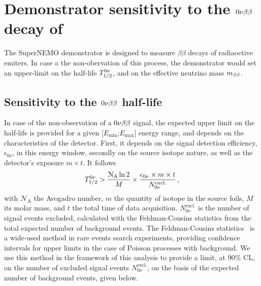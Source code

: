 \section{Demonstrator sensitivity to the $0\nu\beta\beta$ decay of \Se}
\label{sec:Nbkg_ROI}

The SuperNEMO demonstrator is designed to measure $\beta\beta$ decays of radiaoctive emiters.
In case a the non-obervation of this process, the demonstrator would set an upper-limit on the half-life $T_{1/2}^{0\nu}$, and on the effective neutrino mass $m_{\beta\beta}$.

\subsection{Sensitivity to the $0\nu\beta\beta$ half-life}

In case of the non-observation of a $0\nu\beta\beta$ signal, the expected upper limit on the half-life is provided for a given [$E_{\text{min}}$;$E_{\text{max}}$] energy range, and depends on the characteristics of the detector.
First, it depends on the signal detection efficiency, $\epsilon_{0\nu}$, in this energy window, secondly on the source isotope nature, as well as the detector's exposure $m\times t$.
It follows
\begin{equation}
  T_{1/2}^{0\nu} > \frac{\mathcal{N}_{\text{A}}\ln{2}}{M}\times \frac{\epsilon_{0\nu}\times m\times t}{N_{0\nu}^{\text{excl.}}}\,,
  \label{eq:tbeta_limit}
\end{equation}
with $\mathcal{N}_{\text{A}}$ the Avogadro number, $m$ the quantity of isotope in the source foils, $M$ its molar mass, and $t$ the total time of data acquisition.
$N_{0\nu}^{\text{excl.}}$ is the number of signal events excluded, calculated with the Feldman-Cousins statistics from the total expected number of background events.
The Feldman-Cousins statistics~\cite{art:feld-cous} is a wide-used method in rare events search experiments, providing confidence intervals for upper limits in the case of Poisson processes with background.
We use this method in the framework of this analysis to provide a limit, at $90\%$ CL, on the number of excluded signal events $N_{0\nu}^{\text{excl.}}$, on the basis of the expected number of background events, given below.
